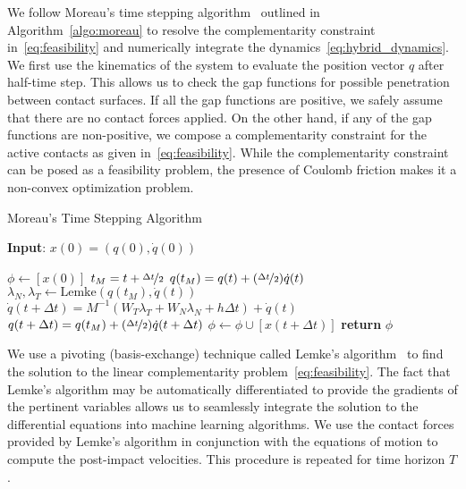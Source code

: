 We follow Moreau's time stepping algorithm~\cite{glocker2005formulation}
outlined in Algorithm~\eqref{algo:moreau} to resolve the complementarity
constraint in~\eqref{eq:feasibility} and numerically integrate the
dynamics~\eqref{eq:hybrid_dynamics}. 
%
We first use the kinematics of the system to evaluate the position vector $q$
after half-time step.
%
This allows us to check the gap functions for possible penetration between
contact surfaces.
%
If all the gap functions are positive, we safely assume that there are no
contact forces applied.
%
On the other hand, if any of the gap functions are non-positive, we compose a
complementarity constraint for the active contacts as given
in~\eqref{eq:feasibility}.
%
While the complementarity constraint can be posed as a feasibility problem, the
presence of Coulomb friction makes it a non-convex optimization problem. 
%
\begin{algorithm}[H]
    \caption{Moreau's Time Stepping Algorithm}
    \label{algo:moreau}
    \small
    \hspace*{\algorithmicindent} \textbf{Input}: $x(0) = (q(0), \dot{q}(0))$
    \begin{algorithmic}[1]
      \State $\phi \leftarrow  [x(0)]$ 
           
            \State $t_M = t + \nicefrac{\Delta t}{2}$
            \State $q(t_M) = q(t) +  (\nicefrac{\Delta t}{2}) \dot{q}(t) $
            \State $\lambda_N, \lambda_T \leftarrow \text{Lemke}(q(t_M), \dot{q}(t))$ 
            \State $\dot{q}(t+\Delta t) = M^{-1}(W_T \lambda_T + W_N \lambda_N + h\Delta t) + \dot{q}(t)$
            \State $q(t + \Delta t) =  q(t_M) +  (\nicefrac{\Delta t}{2})\dot{q}(t+\Delta t)$
            \State $\phi \leftarrow \phi \cup [x(t+\Delta t)]$
          \EndFor
        \State \textbf{return} $\phi$
    \end{algorithmic}
\end{algorithm}
%
We use a pivoting (basis-exchange) technique called Lemke's
algorithm~\cite{acary2008numerical} to find the solution to the linear
complementarity problem~\eqref{eq:feasibility}. The fact that Lemke's algorithm
may be automatically differentiated to provide the gradients of the pertinent
variables allows us to seamlessly integrate the solution to the differential
equations into machine learning algorithms.
%
We use the contact forces provided by Lemke's algorithm in conjunction with the
equations of motion to compute the post-impact velocities.
%
This procedure is repeated for time horizon $T$.



